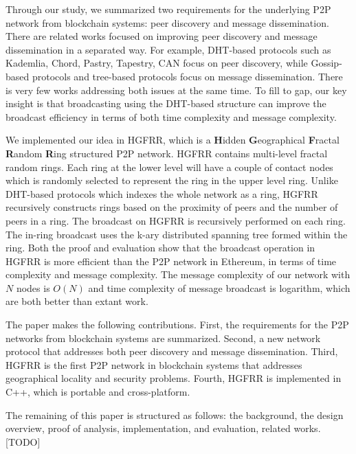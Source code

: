 Through our study, we summarized two requirements for the underlying P2P network from blockchain systems: peer discovery and message dissemination. There are related works focused on improving peer discovery and message dissemination in a separated way. For example, DHT-based protocols such as Kademlia, Chord, Pastry, Tapestry, CAN focus on peer discovery, while Gossip-based protocols and tree-based protocols focus on message dissemination. There is very few works addressing both issues at the same time. To fill to gap, our key insight is that broadcasting using the DHT-based structure can improve the broadcast efficiency in terms of both time complexity and message complexity.

We implemented our idea in HGFRR, which is a \textbf{H}idden \textbf{G}eographical \textbf{F}ractal \textbf{R}andom \textbf{R}ing structured P2P network. HGFRR contains multi-level fractal random rings. Each ring at the lower level will have a couple of contact nodes which is randomly selected to represent the ring in the upper level ring. Unlike DHT-based protocols which indexes the whole network as a ring, HGFRR recursively constructs rings based on the proximity of peers and the number of peers in a ring. The broadcast on HGFRR is recursively performed on each ring. The in-ring broadcast uses the k-ary distributed spanning tree formed within the ring. Both the proof and evaluation show that the broadcast operation in HGFRR is more efficient than the P2P network in Ethereum, in terms of time complexity and message complexity. The message complexity of our network with $N$ nodes is $O(N)$ and time complexity of message broadcast is logarithm, which are both better than extant work.

The paper makes the following contributions. First, the requirements for the P2P networks from blockchain systems are summarized. Second, a new network protocol that addresses both peer discovery and message dissemination. Third, HGFRR is the first P2P network in blockchain systems that addresses geographical locality and security problems. Fourth, HGFRR is implemented in C++, which is portable and cross-platform.

The remaining of this paper is structured as follows: the background, the design overview, proof of analysis, implementation, and evaluation, related works. [TODO]